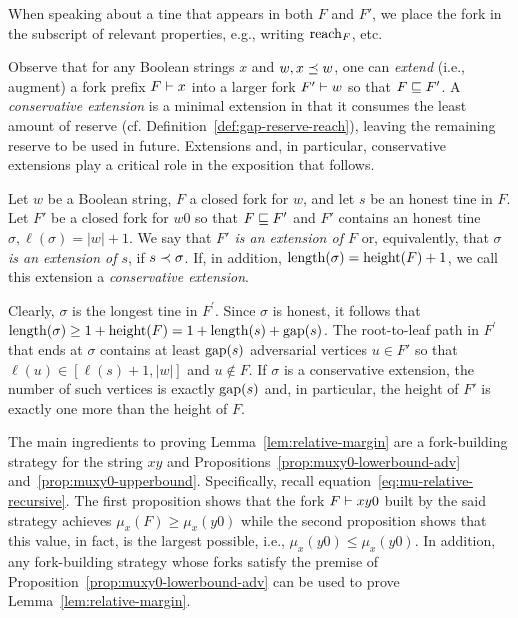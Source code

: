 \noindent
When speaking about a tine that appears in both $F$ and $F'$, 
we place the fork in the subscript of relevant properties, e.g., writing $\operatorname{reach}_F$, etc.

Observe that for any Boolean strings $x$ and $w, x \preceq w$, 
one can \emph{extend} (i.e., augment) a fork prefix $F \vdash x$ into a larger fork $F' \vdash w$ so that $F \sqsubseteq F'$. 
A \emph{conservative extension} is a minimal extension in that 
it consumes the least amount of reserve (cf. Definition~\ref{def:gap-reserve-reach}), 
leaving the remaining reserve to be used in future.
Extensions and, in particular, conservative extensions 
play a critical role in the exposition that follows. 
\begin{definition}\label{def:extension}  

  Let $w$ be a Boolean string, $F$ a closed fork for $w$, 
  and let $s$ be an honest tine in $F$.
  Let $F'$ be a closed fork for $w0$ so that $F \sqsubseteq F'$ and 
  $F'$ contains an honest tine $\sigma, \ell(\sigma) = |w| + 1$. 
  We say that \emph{$F'$ is an extension of $F$} or, equivalently, 
  that \emph{$\sigma$ is an extension of $s$}, if $s \prec \sigma$. 
  If, in addition, 
  $\operatorname{length}(\sigma) = \operatorname{height}(F) + 1$, 
  we call this extension a \emph{conservative extension}.
\end{definition}
Clearly, $\sigma$ is the longest tine in $F^\prime$. 
Since $\sigma$ is honest, 
it follows that 
$\operatorname{length}(\sigma) 
\geq 1 + \operatorname{height}(F) 
= 1 + \operatorname{length}(s) + \operatorname{gap}(s)$.
The root-to-leaf path in $F^\prime$ 
that ends at $\sigma$ 
contains at least $\operatorname{gap}(s)$ adversarial vertices $u \in F'$ 
so that $\ell(u) \in [\ell(s) + 1, |w|]$ and 
$u \not \in F$. 
If $\sigma$ is a conservative extension, 
the number of such vertices is exactly $\operatorname{gap}(s)$ 
and, in particular, 
the height of $F'$ is exactly one more than the height of $F$.


The main ingredients to proving Lemma~\ref{lem:relative-margin} 
are a fork-building strategy for the string $xy$ 
and Propositions~\ref{prop:muxy0-lowerbound-adv} 
and~\ref{prop:muxy0-upperbound}. 
Specifically, 
recall equation~\eqref{eq:mu-relative-recursive}. 
The first proposition shows that the fork $F \vdash xy0$ 
built by the said strategy achieves 
$\mu_x(F) \geq \mu_x(y0)$ while 
the second proposition shows that this value, in fact, is the largest possible, 
i.e., $\mu_x(y0) \leq \mu_x(y0)$.
In addition, any fork-building strategy 
whose forks satisfy the premise of Proposition~\ref{prop:muxy0-lowerbound-adv} 
can be used to prove Lemma~\ref{lem:relative-margin}. 




